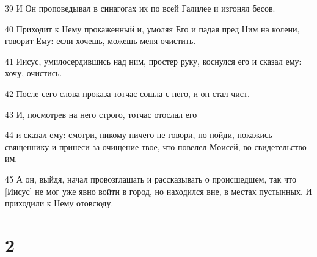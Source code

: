 \par 39 И Он проповедывал в синагогах их по всей Галилее и изгонял бесов.
\par 40 Приходит к Нему прокаженный и, умоляя Его и падая пред Ним на колени, говорит Ему: если хочешь, можешь меня очистить.
\par 41 Иисус, умилосердившись над ним, простер руку, коснулся его и сказал ему: хочу, очистись.
\par 42 После сего слова проказа тотчас сошла с него, и он стал чист.
\par 43 И, посмотрев на него строго, тотчас отослал его
\par 44 и сказал ему: смотри, никому ничего не говори, но пойди, покажись священнику и принеси за очищение твое, что повелел Моисей, во свидетельство им.
\par 45 А он, выйдя, начал провозглашать и рассказывать о происшедшем, так что [Иисус] не мог уже явно войти в город, но находился вне, в местах пустынных. И приходили к Нему отовсюду.

\chapter{2}

